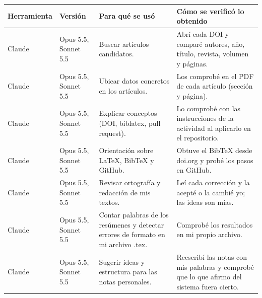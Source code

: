 \begin{tabularx}{\textwidth}{@{}ll>{\raggedright\arraybackslash}X>{\raggedright\arraybackslash}X@{}}
  \toprule
  \textbf{Herramienta} & \textbf{Versión} & \textbf{Para qué se usó} & \textbf{Cómo se verificó lo obtenido} \\
  \midrule
  Claude & Opus 5.5, Sonnet 5.5 & Buscar artículos candidatos. & Abrí cada DOI y comparé autores, año, título, revista, volumen y páginas. \\
  \addlinespace
  Claude & Opus 5.5, Sonnet 5.5 & Ubicar datos concretos en los artículos. & Los comprobé en el PDF de cada artículo (sección y página). \\
  \addlinespace
  Claude & Opus 5.5, Sonnet 5.5 & Explicar conceptos (DOI, biblatex, pull request). & Lo comprobé con las instrucciones de la actividad al aplicarlo en el repositorio. \\
  \addlinespace
  Claude & Opus 5.5, Sonnet 5.5 & Orientación sobre LaTeX, BibTeX y GitHub. & Obtuve el BibTeX desde doi.org y probé los pasos en GitHub. \\
  \addlinespace
  Claude & Opus 5.5, Sonnet 5.5 & Revisar ortografía y redacción de mis textos. & Leí cada corrección y la acepté o la cambié yo; las ideas son mías. \\
  \addlinespace
  Claude & Opus 5.5, Sonnet 5.5 & Contar palabras de los resúmenes y detectar errores de formato en mi archivo .tex. & Comprobé los resultados en mi propio archivo. \\
  \addlinespace
  Claude & Opus 5.5, Sonnet 5.5 & Sugerir ideas y estructura para las notas personales. & Reescribí las notas con mis palabras y comprobé que lo que afirmo del sistema fuera cierto. \\
  \bottomrule
\end{tabularx}
